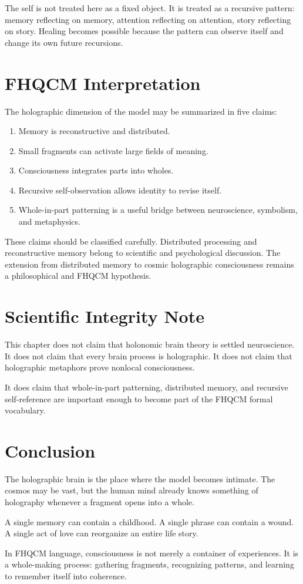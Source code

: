 The self is not treated here as a fixed object. It is treated as a recursive pattern: memory reflecting on memory, attention reflecting on attention, story reflecting on story. Healing becomes possible because the pattern can observe itself and change its own future recursions.

\section{FHQCM Interpretation}

The holographic dimension of the model may be summarized in five claims:

\begin{enumerate}
\item Memory is reconstructive and distributed.
\item Small fragments can activate large fields of meaning.
\item Consciousness integrates parts into wholes.
\item Recursive self-observation allows identity to revise itself.
\item Whole-in-part patterning is a useful bridge between neuroscience, symbolism, and metaphysics.
\end{enumerate}

These claims should be classified carefully. Distributed processing and reconstructive memory belong to scientific and psychological discussion. The extension from distributed memory to cosmic holographic consciousness remains a philosophical and FHQCM hypothesis.

\section{Scientific Integrity Note}

This chapter does not claim that holonomic brain theory is settled neuroscience. It does not claim that every brain process is holographic. It does not claim that holographic metaphors prove nonlocal consciousness.

It does claim that whole-in-part patterning, distributed memory, and recursive self-reference are important enough to become part of the FHQCM formal vocabulary.

\section{Conclusion}

The holographic brain is the place where the model becomes intimate. The cosmos may be vast, but the human mind already knows something of holography whenever a fragment opens into a whole.

A single memory can contain a childhood. A single phrase can contain a wound. A single act of love can reorganize an entire life story.

In FHQCM language, consciousness is not merely a container of experiences. It is a whole-making process: gathering fragments, recognizing patterns, and learning to remember itself into coherence.
